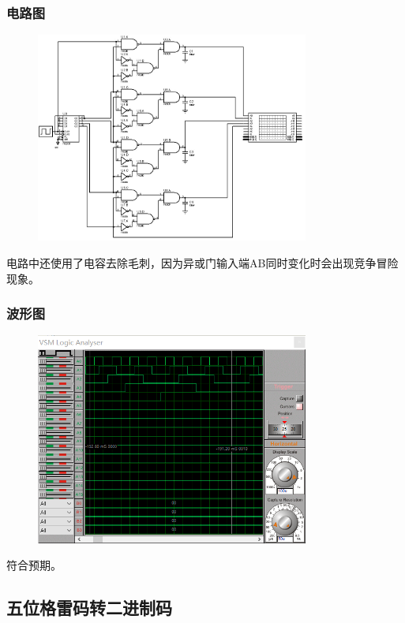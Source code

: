 \documentclass[UTF8, a4paper, 11pt]{article}
\begin{document}
\subsubsection{电路图}
\begin{figure}[H]
    \centering
    \includegraphics[width=0.8\textwidth]{ex3.1.jpg}
\end{figure}
电路中还使用了电容去除毛刺，因为异或门输入端AB同时变化时会出现竞争冒险现象。
\subsubsection{波形图}
\begin{figure}[H]
    \centering
    \includegraphics[width=0.8\textwidth]{ex3.1.png}
\end{figure}
符合预期。
\subsection{五位格雷码转二进制码}
\end{document}
